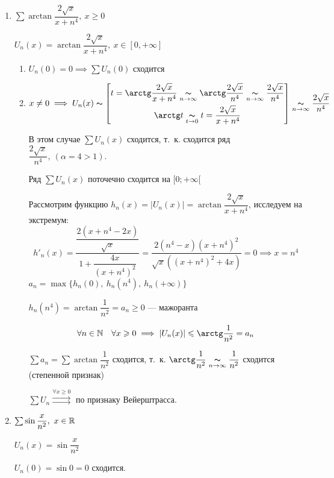 \documentclass[../../main.tex]{subfiles}
\begin{document}
\begin{exmps}
	\;
	
\begin{enumerate}
\item $\sum \arctan\dfrac{2\sqrt{x}}{x+n^4},\ x \geq 0$

$U_n(x) = \arctan\dfrac{2\sqrt{x}}{x+n^4},\ x \in [0,+\infty]$
	\begin{enumerate}
		\item $U_n(0) = 0 \implies \sum U_n(0)$ сходится
		\item $x \neq 0 \implies U_n(x) \thicksim 
	\left[ \begin{gathered}
	t = \arctan\dfrac{2\sqrt{x}}{x+n^4} \underset{n \to \infty}{\thicksim} 
	\arctan\dfrac{2\sqrt{x}}{n^4} \underset{n \to \infty}{\thicksim}
	\dfrac{2\sqrt{x}}{n^4} \\
	\arctan t \underset{t \to 0}{\thicksim}
	t = \dfrac{2\sqrt{x}}{x+n^4}
	\end{gathered} \right] \underset{n \to \infty}{\thicksim}
	\dfrac{2\sqrt{x}}{n^4}$
	
	В этом случае $\sum U_n(x)$ сходится, т.~к. сходится ряд 
	$\dfrac{2\sqrt{x}}{n^4},\ (\alpha = 4 > 1)$.
	
	Ряд $\sum U_n(x)$ поточечно сходится на $[0;+\infty[$
	
	Рассмотрим функцию $h_n(x) = |U_n(x)| = \arctan\dfrac{2\sqrt{x}}{x+n^4}$, 
	исследуем на экстремум: \\
	\[
	h'_n(x) = \dfrac{\dfrac{2(x + n^4 - 2x)}{\sqrt{x}}}
	{1 + \dfrac{4x}{(x+n^4)^2}} = \dfrac{2(n^4-x)(x+n^4)^2}
	{\sqrt{x}((x+n^4)^2+4x)} = 0 \implies x = n^4
	\]
	$a_n = \max\{ h_n(0),\ h_n(n^4),\ h_n(+\infty) \}$
	
	$ h_n(n^4) = \arctan\dfrac{1}{n^2} = a_n \geq 0$ --- мажоранта
	
	\[
	\forall n \in \N \quad \forall x \geq 0 \implies |U_n(x)| \leq 
	\arctan\dfrac{1}{n^2} = a_n
	\]
	
	$\sum a_n = \sum \arctan\dfrac{1}{n^2}$ сходится, т.~к. 
	$\arctan\dfrac{1}{n^2} \underset{n \to \infty}{\thicksim}
	\dfrac{1}{n^2}$ сходится (степенной признак)
	
	$\sum U_n \overset{\forall x \geq 0}{\rightrightarrows}$ 
	по признаку Вейерштрасса.
	\end{enumerate}	

	\item $\sum \sin\dfrac{x}{n^2},\ x \in \mathbb{R}$ 	 
	
	$U_n(x) = \sin\dfrac{x}{n^2}$
	
	$U_n(0) = \sin0 = 0$ сходится.
	

\end{enumerate}
\end{exmps}
\end{document}
